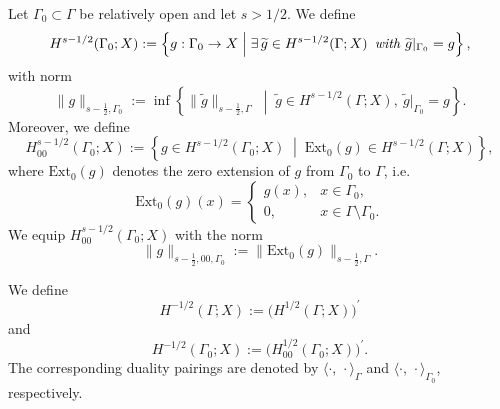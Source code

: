\begin{definition}
	Let $\Gamma_0\subset\Gamma$ be relatively open and let $s>1/2$. We define
	\begin{equation*}
		H^{s-1/2}(\Gamma_0;X)
		:=
		\left\{g:\Gamma_0\to X\;\middle|\;\exists\,\widetilde g\in H^{s-1/2}(\Gamma;X)\text{\em\enspace with }\widetilde g|_{\Gamma_0}=g\right\},
	\end{equation*}
	with norm
	\begin{equation*}
		\|g\|_{s-\tfrac12,\Gamma_0}
		:=
		\inf\left\{
		\|\widetilde g\|_{s-\tfrac12,\Gamma}
		\;\middle|\;
		\widetilde g\in H^{s-1/2}(\Gamma;X),\ \widetilde g|_{\Gamma_0}=g
		\right\}.
	\end{equation*}
	Moreover, we define
	\begin{equation*}
		H^{s-1/2}_{00}(\Gamma_0;X)
		:=
		\left\{g\in H^{s-1/2}(\Gamma_0;X)\;\middle|\;\mathrm{Ext}_0(g)\in H^{s-1/2}(\Gamma;X)\right\},
	\end{equation*}
	where $\mathrm{Ext}_0(g)$ denotes the zero extension of $g$ from $\Gamma_0$ to $\Gamma$, i.e.
	\begin{equation*}
		\mathrm{Ext}_0 (g)(x)
		=
		\begin{cases}
			g(x), & x\in\Gamma_0,                \\
			0,    & x\in\Gamma\setminus\Gamma_0.
		\end{cases}
	\end{equation*}
	We equip $H^{s-1/2}_{00}(\Gamma_0;X)$ with the norm
	\begin{equation*}
		\|g\|_{s-\tfrac12,00,\Gamma_0}:=\|\mathrm{Ext}_0(g)\|_{s-\tfrac12,\Gamma}.
	\end{equation*}
\end{definition}

\begin{definition}\label{def:dual_trace_spaces}
	We define
	\begin{equation*}
		H^{-1/2}(\Gamma;X):=\big(H^{1/2}(\Gamma;X)\big)^\prime
	\end{equation*}
	and
	\begin{equation*}
		H^{-1/2}(\Gamma_0;X):=\big(H^{1/2}_{00}(\Gamma_0;X)\big)^\prime.
	\end{equation*}
	The corresponding duality pairings are denoted by $\langle\cdot,\,\cdot\rangle_\Gamma$ and $\langle\cdot,\,\cdot\rangle_{\Gamma_0}$, respectively.
\end{definition}

